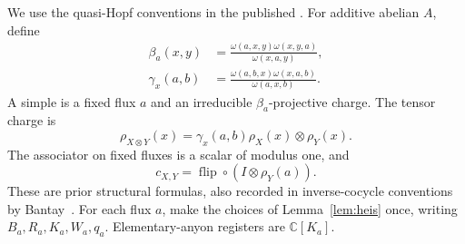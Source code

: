 \documentclass[11pt]{amsart}
\theoremstyle{definition}\newtheorem{definition}[theorem]{Definition}
\newcommand{\C}{\mathbb C}
\begin{document}
We use the quasi-Hopf conventions in the published \cite[Section 3]{ERW}.
For additive abelian $A$, define
\begin{align*}
 \beta_a(x,y)&=\frac{\omega(a,x,y)\omega(x,y,a)}{\omega(x,a,y)},\\
 \gamma_x(a,b)&=\frac{\omega(a,b,x)\omega(x,a,b)}{\omega(a,x,b)}.
\end{align*}
A simple is a fixed flux $a$ and an irreducible $\beta_a$-projective charge.
The tensor charge is
\begin{equation}\label{eq:coproduct}
 \rho_{X\otimes Y}(x)=\gamma_x(a,b)\rho_X(x)\otimes\rho_Y(x).
\end{equation}
The associator on fixed fluxes is a scalar of modulus one, and
\begin{equation}\label{eq:braid}
 c_{X,Y}=\operatorname{flip}\circ(I\otimes\rho_Y(a)).
\end{equation}
These are prior structural formulas, also recorded in inverse-cocycle
conventions by Bantay~\cite[Appendix A]{Bantay}.
For each flux $a$, make the choices of Lemma~\ref{lem:heis} once, writing
$B_a,R_a,K_a,W_a,q_a$. Elementary-anyon registers are $\C[K_a]$.
\end{document}
